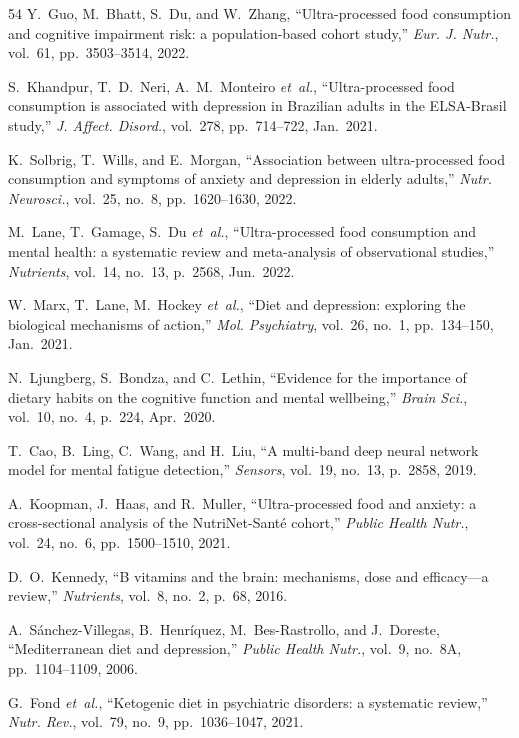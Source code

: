 \documentclass[journal,twoside,10pt]{IEEEtran}
\begin{document}
\begin{thebibliography}{54}
 Y.~Guo, M.~Bhatt, S.~Du, and W.~Zhang, ``Ultra-processed food consumption and cognitive impairment risk: a population-based cohort study,'' \textit{Eur. J. Nutr.}, vol.~61, pp.~3503--3514, 2022.

 S.~Khandpur, T.~D.~Neri, A.~M.~Monteiro \textit{et~al.}, ``Ultra-processed food consumption is associated with depression in Brazilian adults in the ELSA-Brasil study,'' \textit{J. Affect. Disord.}, vol.~278, pp.~714--722, Jan.~2021.

 K.~Solbrig, T.~Wills, and E.~Morgan, ``Association between ultra-processed food consumption and symptoms of anxiety and depression in elderly adults,'' \textit{Nutr. Neurosci.}, vol.~25, no.~8, pp.~1620--1630, 2022.

 M.~Lane, T.~Gamage, S.~Du \textit{et~al.}, ``Ultra-processed food consumption and mental health: a systematic review and meta-analysis of observational studies,'' \textit{Nutrients}, vol.~14, no.~13, p.~2568, Jun.~2022.

 W.~Marx, T.~Lane, M.~Hockey \textit{et~al.}, ``Diet and depression: exploring the biological mechanisms of action,'' \textit{Mol. Psychiatry}, vol.~26, no.~1, pp.~134--150, Jan.~2021.

 N.~Ljungberg, S.~Bondza, and C.~Lethin, ``Evidence for the importance of dietary habits on the cognitive function and mental wellbeing,'' \textit{Brain Sci.}, vol.~10, no.~4, p.~224, Apr.~2020.

 T.~Cao, B.~Ling, C.~Wang, and H.~Liu, ``A multi-band deep neural network model for mental fatigue detection,'' \textit{Sensors}, vol.~19, no.~13, p.~2858, 2019.

 A.~Koopman, J.~Haas, and R.~Muller, ``Ultra-processed food and anxiety: a cross-sectional analysis of the NutriNet-Sant\'{e} cohort,'' \textit{Public Health Nutr.}, vol.~24, no.~6, pp.~1500--1510, 2021.

 D.~O.~Kennedy, ``B vitamins and the brain: mechanisms, dose and efficacy---a review,'' \textit{Nutrients}, vol.~8, no.~2, p.~68, 2016.

 A.~S\'{a}nchez-Villegas, B.~Henr\'{i}quez, M.~Bes-Rastrollo, and J.~Doreste, ``Mediterranean diet and depression,'' \textit{Public Health Nutr.}, vol.~9, no.~8A, pp.~1104--1109, 2006.

 G.~Fond \textit{et~al.}, ``Ketogenic diet in psychiatric disorders: a systematic review,'' \textit{Nutr. Rev.}, vol.~79, no.~9, pp.~1036--1047, 2021.


\end{thebibliography}
\end{document}
